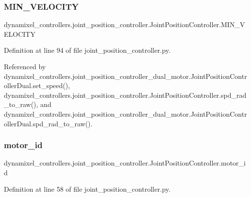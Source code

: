 \subsubsection{\texorpdfstring{M\+I\+N\+\_\+\+V\+E\+L\+O\+C\+I\+TY}{MIN\_VELOCITY}}
{\footnotesize\ttfamily dynamixel\+\_\+controllers.\+joint\+\_\+position\+\_\+controller.\+Joint\+Position\+Controller.\+M\+I\+N\+\_\+\+V\+E\+L\+O\+C\+I\+TY}



Definition at line 94 of file joint\+\_\+position\+\_\+controller.\+py.



Referenced by dynamixel\+\_\+controllers.\+joint\+\_\+position\+\_\+controller\+\_\+dual\+\_\+motor.\+Joint\+Position\+Controller\+Dual.\+set\+\_\+speed(), dynamixel\+\_\+controllers.\+joint\+\_\+position\+\_\+controller.\+Joint\+Position\+Controller.\+spd\+\_\+rad\+\_\+to\+\_\+raw(), and dynamixel\+\_\+controllers.\+joint\+\_\+position\+\_\+controller\+\_\+dual\+\_\+motor.\+Joint\+Position\+Controller\+Dual.\+spd\+\_\+rad\+\_\+to\+\_\+raw().

\mbox{\label{classdynamixel__controllers_1_1joint__position__controller_1_1_joint_position_controller_aeb32b28958cad0fa92972d5f4fdbb071}} 
\subsubsection{\texorpdfstring{motor\+\_\+id}{motor\_id}}
{\footnotesize\ttfamily dynamixel\+\_\+controllers.\+joint\+\_\+position\+\_\+controller.\+Joint\+Position\+Controller.\+motor\+\_\+id}



Definition at line 58 of file joint\+\_\+position\+\_\+controller.\+py.



